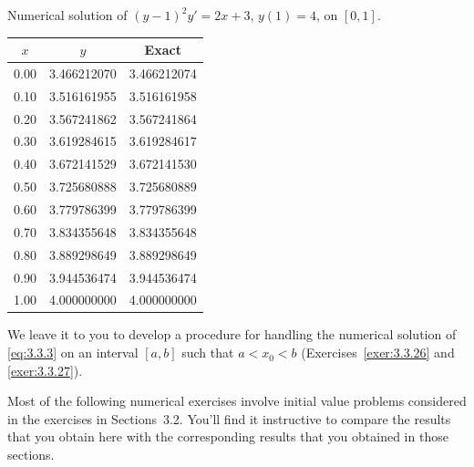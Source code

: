 \begin{examplesolution}
\begin{newtable}
  \label{table:3.3.6} Numerical solution of $(y-1)^{2}y'=2x+3$, $y(1)=4$, on $[0,1]$.
  \begin{center}
    \begin{tabular}{|r|r|r|}
      \hline
      \multicolumn{1}{|c|}{$x$} & \multicolumn{1}{|c|}{$y$} & \multicolumn{1}{|c|}{Exact} \\
      \hline
      0.00                      & 3.466212070               & 3.466212074                 \\
      0.10                      & 3.516161955               & 3.516161958                 \\
      0.20                      & 3.567241862               & 3.567241864                 \\
      0.30                      & 3.619284615               & 3.619284617                 \\
      0.40                      & 3.672141529               & 3.672141530                 \\
      0.50                      & 3.725680888               & 3.725680889                 \\
      0.60                      & 3.779786399               & 3.779786399                 \\
      0.70                      & 3.834355648               & 3.834355648                 \\
      0.80                      & 3.889298649               & 3.889298649                 \\
      0.90                      & 3.944536474               & 3.944536474                 \\
      1.00                      & 4.000000000               & 4.000000000                 \\
      \hline
    \end{tabular}
  \end{center}
\end{newtable}
\end{examplesolution}

We leave it to you to develop a procedure for handling the numerical solution of \eqref{eq:3.3.3} on
an interval $[a,b]$ such that $a<x_{0}<b$ (Exercises~\ref{exer:3.3.26} and \ref{exer:3.3.27}).

\exercises Most of the following numerical exercises involve initial value problems considered in the exercises in Sections~3.2. You'll find it instructive to compare the results that you obtain here with the corresponding results that you obtained in those sections.

